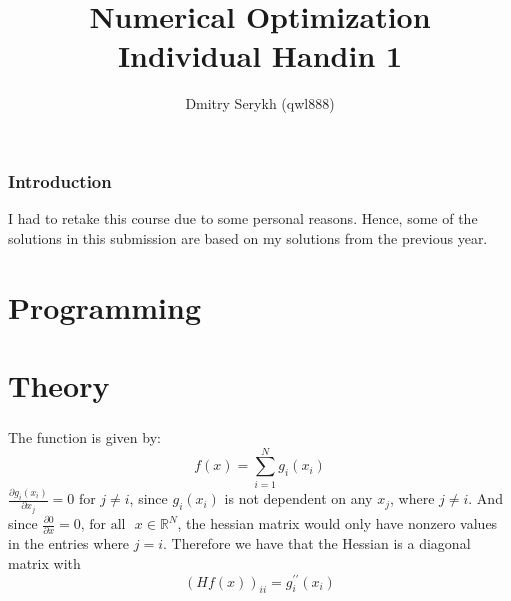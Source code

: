 \documentclass[a4paper]{article}
\title{\vspace{-5cm} Numerical Optimization \\ Individual Handin 1}
\author{Dmitry Serykh (qwl888)}
\begin{document}
\maketitle
\section*{Introduction}
I had to retake this course due to some personal reasons.
Hence, some of the solutions in this submission are based on my solutions from
the previous year.

\part{Programming}

\part{Theory}
\section{}
The function is given by:
\[
f(x)=\sum_{i=1}^{N} g_{i}\left(x_{i}\right)
\]
$\frac{\partial g_{i}(x_{i})}{\partial x_j} = 0\text{ for }j\neq i$, since
$g_i(x_i)$ is not dependent on any $x_j$, where $j \neq i$.
And since $\frac{\partial 0}{\partial x} = 0\text{, for all }$ $x \in
\mathbb{R}^{N}$, the hessian matrix would only have nonzero values in the
entries where $j=i$. Therefore we have that the Hessian is a diagonal matrix with 
\[
(H f(x))_{i  i}=g_{i}^{\prime \prime}\left(x_{i}\right)
\]
\section{}
\end{document}
